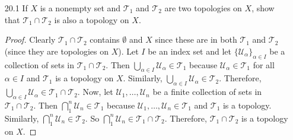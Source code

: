 \documentclass[10pt]{article}
\newcommand{\U}{\mathcal{U}}
\newcommand{\T}{\mathcal{T}}
\begin{document}
\begin{enumerate}
\item[20.1] If $X$ is a nonempty set and $\T_1$ and $\T_2$ are two topologies on $X$, show that $\T_1 \cap \T_2$ is also a topology on $X$.

\begin{proof}
Clearly $\T_1 \cap \T_2$ contains $\emptyset$ and $X$ since these are in both $\T_1$ and $\T_2$ (since they are topologies on $X$).  Let $I$ be an index set and let $\{\U_\alpha\}_{\alpha \in I}$ be a collection of sets in $\T_1 \cap \T_2$.  Then $\bigcup_{\alpha \in I} \U_\alpha \in \T_1$ because $\U_\alpha \in \T_1$ for all $\alpha \in I$ and $\T_1$ is a topology on $X$.  Similarly, $\bigcup_{\alpha \in I} \U_\alpha \in \T_2$.  Therefore, $\bigcup_{\alpha \in I} \U_\alpha \in \T_1 \cap \T_2$.  Now, let $\U_1, \dots , \U_n$ be a finite collection of sets in $\T_1 \cap \T_2$.  Then $\bigcap_1^n \U_n \in \T_1$ because $\U_1, \dots, \U_n \in \T_1$ and $\T_1$ is a topology.  Similarly, $\bigcap_1^n \U_n \in \T_2$.  So $\bigcap_1^n \U_n \in \T_1 \cap \T_2$.  Therefore, $\T_1 \cap \T_2$ is a topology on $X$.
\end{proof}


\end{enumerate}
\end{document}
